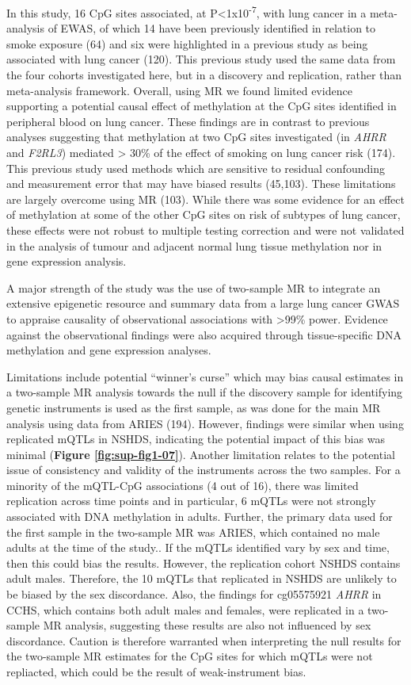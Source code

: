 \documentclass[11pt,oneside]{bristolthesis}
\begin{document}
In this study, 16 CpG sites associated, at P\textless1x10\textsuperscript{-7}, with lung cancer in a meta-analysis of EWAS, of which 14 have been previously identified in relation to smoke exposure (64) and six were highlighted in a previous study as being associated with lung cancer (120). This previous study used the same data from the four cohorts investigated here, but in a discovery and replication, rather than meta-analysis framework. Overall, using MR we found limited evidence supporting a potential causal effect of methylation at the CpG sites identified in peripheral blood on lung cancer. These findings are in contrast to previous analyses suggesting that methylation at two CpG sites investigated (in \emph{AHRR} and \emph{F2RL3}) mediated \textgreater{} 30\% of the effect of smoking on lung cancer risk (174). This previous study used methods which are sensitive to residual confounding and measurement error that may have biased results (45,103). These limitations are largely overcome using MR (103). While there was some evidence for an effect of methylation at some of the other CpG sites on risk of subtypes of lung cancer, these effects were not robust to multiple testing correction and were not validated in the analysis of tumour and adjacent normal lung tissue methylation nor in gene expression analysis.

A major strength of the study was the use of two-sample MR to integrate an extensive epigenetic resource and summary data from a large lung cancer GWAS to appraise causality of observational associations with \textgreater99\% power. Evidence against the observational findings were also acquired through tissue-specific DNA methylation and gene expression analyses.

Limitations include potential ``winner's curse'' which may bias causal estimates in a two-sample MR analysis towards the null if the discovery sample for identifying genetic instruments is used as the first sample, as was done for the main MR analysis using data from ARIES (194). However, findings were similar when using replicated mQTLs in NSHDS, indicating the potential impact of this bias was minimal (\textbf{Figure \ref{fig:sup-fig1-07}}). Another limitation relates to the potential issue of consistency and validity of the instruments across the two samples. For a minority of the mQTL-CpG associations (4 out of 16), there was limited replication across time points and in particular, 6 mQTLs were not strongly associated with DNA methylation in adults. Further, the primary data used for the first sample in the two-sample MR was ARIES, which contained no male adults at the time of the study.. If the mQTLs identified vary by sex and time, then this could bias the results. However, the replication cohort NSHDS contains adult males. Therefore, the 10 mQTLs that replicated in NSHDS are unlikely to be biased by the sex discordance. Also, the findings for cg05575921 \emph{AHRR} in CCHS, which contains both adult males and females, were replicated in a two-sample MR analysis, suggesting these results are also not influenced by sex discordance. Caution is therefore warranted when interpreting the null results for the two-sample MR estimates for the CpG sites for which mQTLs were not repliacted, which could be the result of weak-instrument bias.
\end{document}
